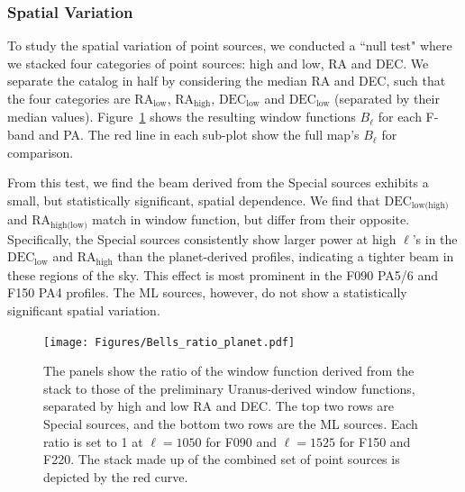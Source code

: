 \subsubsection{Spatial Variation}
\label{subsubsec:null_mainbeam}
To study the spatial variation of point sources, we conducted a ``null test" where we stacked four categories of point sources: high and low, RA and DEC.  We separate the catalog in half by considering the median RA and DEC, such that the four categories are $\text{RA}_{\text{low}}$, $\text{RA}_{\text{high}}$, $\text{DEC}_{\text{low}}$ and $\text{DEC}_{\text{low}}$ (separated by their median values). 
 Figure~\ref{fig:bells} shows the resulting window functions $B_{\ell}$ for each F-band and PA.  The red line in each sub-plot show the full map's $B_{\ell}$ for comparison.

From this test, we find the beam derived from the Special sources exhibits a small, but statistically significant, spatial dependence. We find that $\text{DEC}_{\text{low(high)}}$
and $\text{RA}_{\text{high(low)}}$ match in window function, but differ from their opposite. 
 Specifically, the Special sources consistently show larger power at high $\ell$'s in the $\text{DEC}_{\text{low}}$ and $\text{RA}_{\text{high}}$ than the planet-derived profiles, indicating a tighter beam in these regions of the sky. This effect is most prominent in the F090 PA5/6 and F150 PA4 profiles. The ML sources, however, do not show a statistically significant spatial variation.

\begin{figure}
    \centering
    \texttt{[image: Figures/Bells\_ratio\_planet.pdf]}
    \caption{The panels show the ratio of the window function derived from the stack to those of the preliminary Uranus-derived window functions, separated by high and low RA and DEC.  The top two rows are Special sources, and the bottom two rows are the ML sources.  Each ratio is set to 1 at $\ell=1050$ for F090 and $\ell=1525$ for F150 and F220.  The stack made up of the combined set of point sources is depicted by the red curve.}
    \label{fig:bells}
\end{figure}

